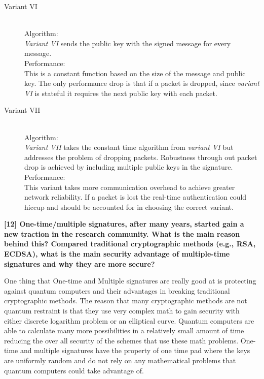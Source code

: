 \documentclass[letterpaper,11pt,notitlepage,fleqn]{article}
\begin{document}
\begin{description}
\item[Variant VI] \hfill \\
    Algorithm:\\
        \textit{Variant VI} sends the public key with the signed message for every message.\\
        Performance:\\
        This is a constant function based on the size of the message and public key. The only performance drop is that if a packet is dropped, since \textit{variant VI} is stateful it requires the next public key with each packet. \\

    \item [Variant VII] \hfill \\
        Algorithm:\\
        \textit{Variant VII} takes the constant time algorithm from \textit{variant VI} but addresses the problem of dropping packets. Robustness through out packet drop is achieved by including multiple public keys in the signature. \\
        Performance:\\
This variant takes more communication overhead to achieve greater network reliability. If a packet is lost the real-time authentication could hiccup and should be accounted for in choosing the correct variant. \\

\end{description}

\noindent \textbf{[12] One-time/multiple signatures, after many years, started gain a new traction in  the  research  community.  What  is  the  main  reason  behind  this?  Compared traditional cryptographic methods  (e.g., RSA, ECDSA), what  is  the main security advantage of multiple-time signatures and why they are more secure?}  

One thing that One-time and Multiple signatures are really good at is protecting against quantum computers and their advantages in breaking traditional cryptographic methods. The reason that many cryptographic methods are not quantum restraint is that they use very complex math to gain security with either discrete logarithm problem or an elliptical curve. Quantum computers are able to calculate many more possibilities in a relatively small amount of time reducing the over all
security of the schemes that use these math problems. One-time and multiple signatures have the property of one time pad where the keys are uniformly random and do not rely on any mathematical problems that quantum computers could take advantage of. 
\end{document}
